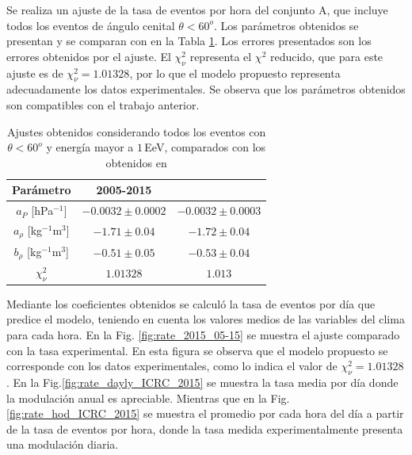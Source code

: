 			Se realiza un ajuste de la tasa de eventos por hora del conjunto A, que incluye todos los eventos de ángulo cenital $\theta< 60^o$. Los parámetros obtenidos se presentan y se comparan con \cite{aab2017impact} en la Tabla \ref{tabla:parametros_ICRC_2015}. Los errores presentados son los errores obtenidos por el ajuste. El $\chi^2_\nu$ representa el $\chi^2$ reducido, que para este ajuste es de $\chi^2_\nu=1.01328$, por lo que el modelo propuesto representa adecuadamente los datos experimentales. Se observa que los parámetros obtenidos son compatibles con el trabajo anterior.
			\begin{table}[H]
				\centering
				\begin{tabular}{|c|c|c|}
				\hline
				\textbf{Parámetro}          & \textbf{2005-2015}            & \textbf{\cite{aab2017impact}}     \\ \hline
				$a_P$ [hPa$^{-1}$]          & $-0.0032 \pm 0.0002$          & $-0.0032 \pm 0.0003$              \\ \hline
				$a_\rho$ [kg$^{-1}$m$^3$]   & $-1.71 \pm 0.04 $             & $-1.72 \pm 0.04$                  \\ \hline
				$b_\rho$ [kg$^{-1}$m$^3$]   & $-0.51 \pm 0.05$              & $-0.53 \pm 0.04$                  \\ \hline
				$\chi^2_\nu$                & $1.01328$                     & $1.013$                         \\   \hline
				\end{tabular} 
				\caption{Ajustes obtenidos considerando todos los eventos con $\theta<60^o$ y energía mayor a $1\,$EeV, comparados con los obtenidos en \cite{aab2017impact}} \label{tabla:parametros_ICRC_2015}
			\end{table}

			Mediante los coeficientes obtenidos se calculó la tasa de eventos por día que predice el modelo, teniendo en cuenta los valores medios de las variables del clima para cada hora. En la Fig. \ref{fig:rate_2015_05-15} se muestra el ajuste comparado con la tasa experimental. En esta figura se observa que el modelo propuesto se corresponde con los datos experimentales, como lo indica el valor de $\chi^2_\nu=1.01328$. En la Fig.\ref{fig:rate_dayly_ICRC_2015} se muestra la tasa media por día donde la modulación anual es apreciable. Mientras que en la Fig.\ref{fig:rate_hod_ICRC_2015} se muestra el promedio por cada hora del día a partir de la tasa de eventos por hora, donde la tasa medida experimentalmente presenta una modulación diaria.  


